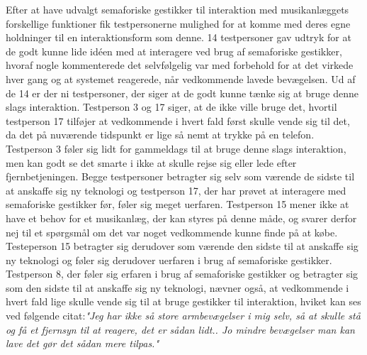 Efter at have udvalgt semaforiske gestikker til interaktion med musikanlæggets forskellige funktioner fik testpersonerne mulighed for at komme med deres egne holdninger til en interaktionsform som denne. 14 testpersoner gav udtryk for at de godt kunne lide idéen med at interagere ved brug af semaforiske gestikker, hvoraf nogle kommenterede det selvfølgelig var med forbehold for at det virkede hver gang og at systemet reagerede, når vedkommende lavede bevægelsen. Ud af de 14 er der ni testpersoner, der siger at de godt kunne tænke sig at bruge denne slags interaktion. Testperson 3 og 17 siger, at de ikke ville bruge det, hvortil testperson 17 tilføjer at vedkommende i hvert fald først skulle vende sig til det, da det på nuværende tidspunkt er lige så nemt at trykke på en telefon. Testperson 3 føler sig lidt for gammeldags til at bruge denne slags interaktion, men kan godt se det smarte i ikke at skulle rejse sig eller lede efter fjernbetjeningen. Begge testpersoner betragter sig selv som værende de sidste til at anskaffe sig ny teknologi og testperson 17, der har prøvet at interagere med semaforiske gestikker før, føler sig meget uerfaren. Testperson 15 mener ikke at have et behov for et musikanlæg, der kan styres på denne måde, og svarer derfor nej til et spørgsmål om det var noget vedkommende kunne finde på at købe. Testeperson 15 betragter sig derudover som værende den sidste til at anskaffe sig ny teknologi og føler sig derudover uerfaren i brug af semaforiske gestikker. Testperson 8, der føler sig erfaren i brug af semaforiske gestikker og betragter sig som den sidste til at anskaffe sig ny teknologi,  nævner også, at vedkommende i hvert fald lige skulle vende sig til at bruge gestikker til interaktion, hviket kan ses ved følgende citat:\textsl{"Jeg har ikke så store armbevægelser i mig selv, så at skulle stå og få et fjernsyn til at reagere, det er sådan lidt.. Jo mindre bevægelser man kan lave det gør det sådan mere tilpas."}

